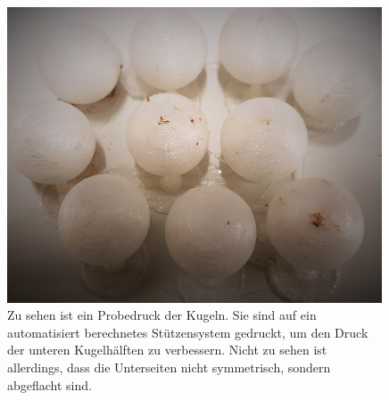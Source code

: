 \begin{figure}[htbp]
\centering
 \includegraphics[width=0.99\textwidth]{images/gedrucktekugeln1.jpg}
  \caption[Probedruck der Kugeln]{Zu sehen ist ein Probedruck der Kugeln. Sie sind auf ein automatisiert berechnetes Stützensystem gedruckt, um den Druck der unteren Kugelhälften zu verbessern. Nicht zu sehen ist allerdings, dass die Unterseiten nicht symmetrisch, sondern abgeflacht sind.}
  \label{fig:gedrucktekugeln1}
  \vspace{-0pt}
\end{figure}